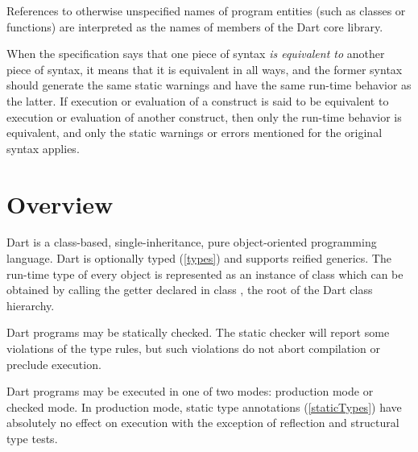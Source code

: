 \documentclass{article}
\begin{document}
\LMHash{}
References to otherwise unspecified names of program entities (such as classes or functions) are interpreted as the names of members of the Dart core library.


\LMHash{}
When the specification says that one piece of syntax {\em is equivalent to} another piece of syntax, it means that it is equivalent in all ways, and the former syntax should generate the same static warnings and have the same run-time behavior as the latter.
If execution or evaluation of a construct is said to be equivalent to execution or evaluation of another construct, then only the run-time behavior is equivalent, and only the static warnings or errors mentioned for the original syntax applies.


\section{Overview}

\LMHash{}
Dart is a class-based, single-inheritance, pure object-oriented programming language.
Dart is optionally typed (\ref{types}) and supports reified generics.
The run-time type of every object is represented as an instance of class  which can be obtained by calling the getter  declared in class , the root of the Dart class hierarchy.

\LMHash{}
Dart programs may be statically checked.
The static checker will report some violations of the type rules, but such violations do not abort compilation or preclude execution.

\LMHash{}
Dart programs may be executed in one of two modes: production mode or checked mode.
In production mode, static type annotations (\ref{staticTypes}) have absolutely no effect on execution with the exception of reflection and structural type tests.

\end{document}
